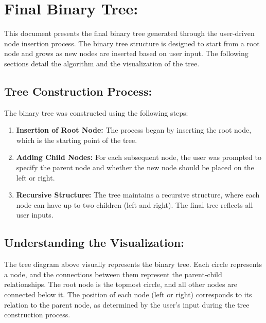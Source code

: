 \documentclass[10pt,a4paper]{article}
\begin{document}
\section*{Final Binary Tree:}
This document presents the final binary tree generated through the user-driven node insertion process. The binary tree structure is designed to start from a root node and grows as new nodes are inserted based on user input. The following sections detail the algorithm and the visualization of the tree.

\subsection*{Tree Construction Process:}
The binary tree was constructed using the following steps:
\begin{enumerate}
    \item \textbf{Insertion of Root Node:} The process began by inserting the root node, which is the starting point of the tree.
    \item \textbf{Adding Child Nodes:} For each subsequent node, the user was prompted to specify the parent node and whether the new node should be placed on the left or right.
    \item \textbf{Recursive Structure:} The tree maintains a recursive structure, where each node can have up to two children (left and right). The final tree reflects all user inputs.
\end{enumerate}

\vspace{1cm}

\begin{center}
\end{center}

\subsection*{Understanding the Visualization:}
The tree diagram above visually represents the binary tree. Each circle represents a node, and the connections between them represent the parent-child relationships. The root node is the topmost circle, and all other nodes are connected below it. The position of each node (left or right) corresponds to its relation to the parent node, as determined by the user's input during the tree construction process.
\end{document}
